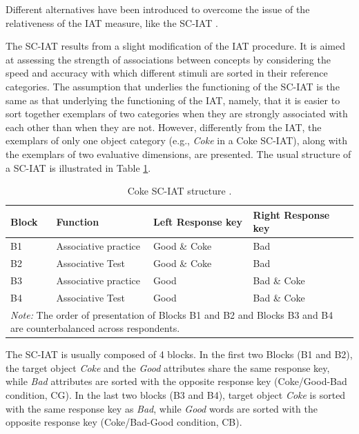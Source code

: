 \documentclass[12pt]{book}
\begin{document}
Different alternatives have been introduced to overcome the issue of the relativeness of the IAT measure, like the SC-IAT \cite{karpinski2006}. 

The SC-IAT results from a slight modification of the IAT procedure. It is aimed at assessing  the strength of associations between concepts by considering the speed and accuracy with which different stimuli are sorted in their reference categories. 
The assumption that underlies the functioning of the SC-IAT is the same as that underlying the functioning of the IAT, namely, that it is easier to sort together exemplars of two categories when they are strongly associated with each other than when they are not. However, differently from the IAT, the exemplars of only one object category (e.g., \emph{Coke} in a Coke SC-IAT), along with the exemplars of two evaluative dimensions, are presented. 
The usual structure of a SC-IAT is illustrated in Table \ref{tab:sciatstructure}. 

\begin{table}[h!]
	\centering \doublespacing
	\caption{Coke SC-IAT structure \protect\cite<adapted from >{karpinski2006}.}
	\label{tab:sciatstructure}
	\begin{tabular}{p{1cm} p{4cm} p{4cm} p{4cm}}
		\toprule
		Block  & Function  & Left Response key & Right Response key \\
		\midrule
		B1  & Associative practice & Good \& Coke & Bad \\
		B2  & Associative Test & Good \& Coke & Bad \\
		B3  & Associative practice & Good  & Bad \& Coke \\
		B4  & Associative Test & Good  & Bad \& Coke \\
		\bottomrule
		\multicolumn{4}{p{13cm}}{\onehalfspacing\emph{Note:} The order of presentation of Blocks B1 and B2 and Blocks B3 and B4 are counterbalanced across respondents.}
	\end{tabular}
\end{table}

The SC-IAT is usually composed of 4 blocks. 
	In the first two Blocks (B1 and B2), the target object \emph{Coke} and the \emph{Good} attributes share the same response key, while \emph{Bad} attributes are sorted with the opposite response key (Coke/Good-Bad condition, CG). 
	In the last two blocks (B3 and B4), target object \emph{Coke} is sorted with the same response key as \emph{Bad}, while \emph{Good} words are sorted with the opposite response key (Coke/Bad-Good condition, CB).  
\end{document}
